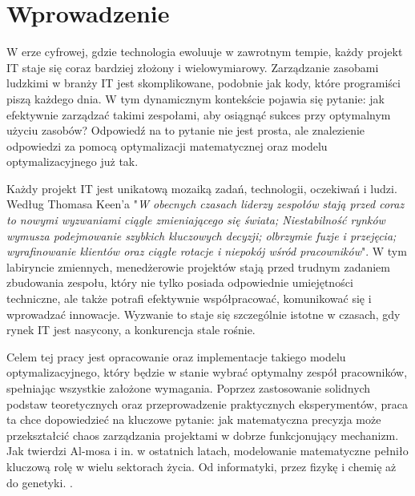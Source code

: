 \chapter*{Wprowadzenie}

\par W erze cyfrowej, gdzie technologia ewoluuje w zawrotnym tempie, każdy projekt IT staje się coraz bardziej złożony i wielowymiarowy. Zarządzanie zasobami ludzkimi w branży IT jest skomplikowane, podobnie jak kody, które programiści piszą każdego dnia. W tym dynamicznym kontekście pojawia się pytanie: jak efektywnie zarządzać takimi zespołami, aby osiągnąć sukces przy optymalnym użyciu zasobów? Odpowiedź na to pytanie nie jest prosta, ale znalezienie odpowiedzi za pomocą optymalizacji matematycznej oraz modelu optymalizacyjnego już tak.

\par Każdy projekt IT jest unikatową mozaiką zadań, technologii, oczekiwań i ludzi. Według Thomasa Keen'a \parencite{keen2003creating} "\textit{W obecnych czasach liderzy zespołów stają przed coraz to nowymi wyzwaniami ciągle zmieniającego się świata; Niestabilność rynków wymusza podejmowanie szybkich kluczowych decyzji; olbrzymie fuzje i przejęcia; wyrafinowanie klientów oraz ciągłe rotacje i niepokój wśród pracowników}". W tym labiryncie zmiennych, menedżerowie projektów stają przed trudnym zadaniem zbudowania zespołu, który nie tylko posiada odpowiednie umiejętności techniczne, ale także potrafi efektywnie współpracować, komunikować się i wprowadzać innowacje. Wyzwanie to staje się szczególnie istotne w czasach, gdy rynek IT jest nasycony, a konkurencja stale rośnie.

\par Celem tej pracy jest opracowanie oraz implementacje takiego modelu optymalizacyjnego, który będzie w stanie wybrać optymalny zespół pracowników, spełniając wszystkie założone wymagania. Poprzez zastosowanie solidnych podstaw teoretycznych oraz przeprowadzenie praktycznych eksperymentów, praca ta chce dopowiedzieć na kluczowe pytanie: jak matematyczna precyzja może przekształcić chaos zarządzania projektami w dobrze funkcjonujący mechanizm. Jak twierdzi Al-mosa i in. w ostatnich latach, modelowanie matematyczne pełniło kluczową rolę w wielu sektorach życia. Od informatyki, przez fizykę i chemię aż do genetyki. \parencite{almosa2023python}.

